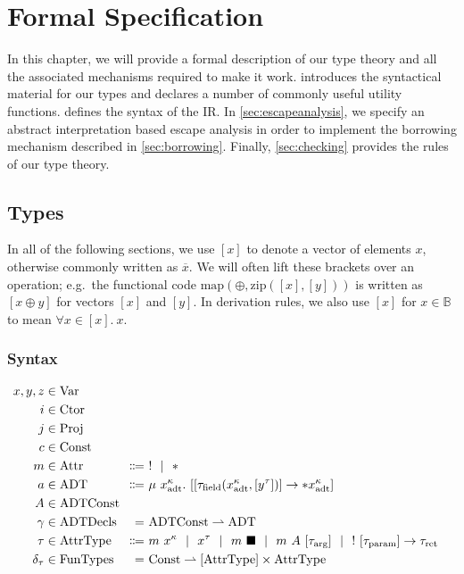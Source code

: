 \chapter{Formal Specification}\label{sec:theory}

In this chapter, we will provide a formal description of our type theory and all the associated mechanisms required to make it work.  introduces the syntactical material for our types and declares a number of commonly useful utility functions.  defines the syntax of the IR. In \cref{sec:escapeanalysis}, we specify an abstract interpretation based escape analysis in order to implement the borrowing mechanism described in \cref{sec:borrowing}. Finally, \cref{sec:checking} provides the rules of our type theory.

\section{Types}\label{sec:types}
In all of the following sections, we use $[x]$ to denote a vector of elements $x$, otherwise commonly written as $\overline{x}$. We will often lift these brackets over an operation; e.g.\ the functional code $\mathrm{map}(\oplus, \mathrm{zip}([x], [y]))$ is written as $[x \oplus y]$ for vectors $[x]$ and $[y]$. In derivation rules, we also use $[x]$ for $x \in \mathbb{B}$ to mean $\forall x \in [x].\ x$.

\subsection{Syntax}

\newcommand{\dom}{\mathrm{dom}}
\newcommand{\Attr}{\mathrm{Attr}}
\newcommand{\ADT}{\mathrm{ADT}}
\newcommand{\adt}{\mathrm{adt}}
\newcommand{\field}{\mathrm{field}}
\newcommand{\ADTConst}{\mathrm{ADTConst}}
\newcommand{\AttrType}{\mathrm{AttrType}}
\newcommand{\arrg}{\mathrm{arg}}
\newcommand{\param}{\mathrm{param}}
\newcommand{\ret}{\mathrm{ret}}
\newcommand{\ADTDecls}{\mathrm{ADTDecls}}
\newcommand{\FunTypes}{\mathrm{FunTypes}}

\begin{alignat*}{2}
  x, y, z &\in \Var \\
  i &\in \Ctor \\
  j &\in \Proj \\
  c &\in \Const \\
  m &\in \Attr &\Coloneqq&\ ! \sep * \\
  a &\in \ADT &\Coloneqq&\ \mu\ x^\kappa_\adt.\ [[\tau_\field(x^\kappa_\adt, [y^\tau])] \to *x^\kappa_\adt] \\
  A &\in \mathrlap{\ADTConst} \\
  \gamma &\in \ADTDecls &=&\ \ADTConst \rightharpoonup \ADT \\
  \tau &\in \AttrType &\Coloneqq&\ m\ x^\kappa \sep x^\tau \sep m\ \blacksquare \sep m\ A\ [\tau_\arrg] \sep !\ [\tau_\param] \to \tau_\ret \\
  \delta_\tau &\in \FunTypes &=&\ \Const \rightharpoonup [\AttrType] \times \AttrType
\end{alignat*}

